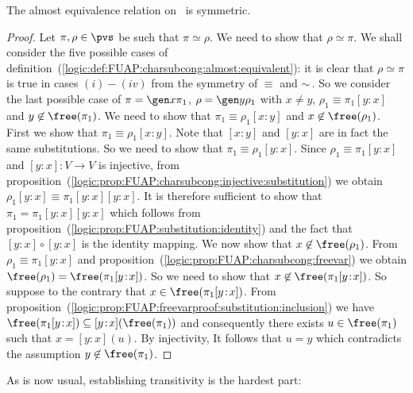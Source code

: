 \begin{prop}\label{logic:prop:FUAP:subcong:almost:symmetric}
The almost equivalence relation on \pvs\ is symmetric.
\end{prop}
\begin{proof}
Let $\pi,\rho\in\pvs$ be such that $\pi\simeq\rho$. We need to show
that $\rho\simeq\pi$. We shall consider the five possible cases of
definition~(\ref{logic:def:FUAP:charsubcong:almost:equivalent}): it
is clear that $\rho\simeq\pi$ is true in cases $(i)-(iv)$ from the
symmetry of $\equiv$ and $\sim$\,. So we consider the last possible
case of $\pi=\gen x\pi_{1}$, $\rho=\gen y\rho_{1}$ with $x\neq y$,
$\rho_{1}\equiv\pi_{1}[y\!:\!x]$ and $y\not\in\free(\pi_{1})$. We
need to show that $\pi_{1}\equiv\rho_{1}[x\!:\!y]$ and
$x\not\in\free(\rho_{1})$. First we show that
$\pi_{1}\equiv\rho_{1}[x\!:\!y]$. Note that $[x\!:\!y]$ and
$[y\!:\!x]$ are in fact the same substitutions. So we need to show
that $\pi_{1}\equiv\rho_{1}[y\!:\!x]$. Since
$\rho_{1}\equiv\pi_{1}[y\!:\!x]$ and $[y\!:\!x]:V\to V$ is
injective, from
proposition~(\ref{logic:prop:FUAP:charsubcong:injective:substitution})
we obtain $\rho_{1}[y\!:\!x]\equiv\pi_{1}[y\!:\!x][y\!:\!x]$. It is
therefore sufficient to show that
$\pi_{1}=\pi_{1}[y\!:\!x][y\!:\!x]$ which follows from
proposition~(\ref{logic:prop:FUAP:substitution:identity}) and the
fact that $[y\!:\!x]\circ[y\!:\!x]$ is the identity mapping. We now
show that $x\not\in\free(\rho_{1})$. From
$\rho_{1}\equiv\pi_{1}[y\!:\!x]$ and
proposition~(\ref{logic:prop:FUAP:charsubcong:freevar}) we obtain
$\free(\rho_{1})=\free(\pi_{1}[y\!:\!x])$. So we need to show that
$x\not\in\free(\pi_{1}[y\!:\!x])$. So suppose to the contrary that
$x\in\free(\pi_{1}[y\!:\!x])$. From
proposition~(\ref{logic:prop:FUAP:freevarproof:substitution:inclusion})
we have $\free(\pi_{1}[y\!:\!x])\subseteq[y\!:\!x](\free(\pi_{1}))$
and consequently there exists $u\in\free(\pi_{1})$ such that
$x=[y\!:\!x](u)$. By injectivity, It follows that $u=y$ which
contradicts the assumption $y\not\in\free(\pi_{1})$.
\end{proof}

As is now usual, establishing transitivity is the hardest part:


